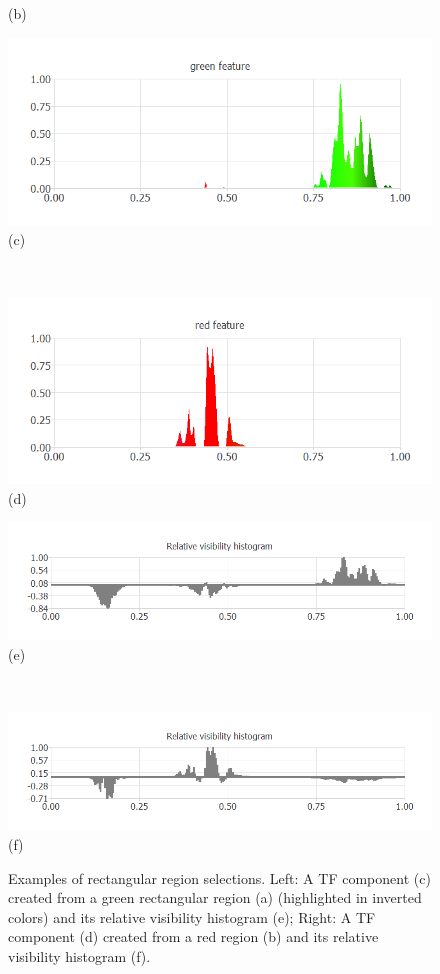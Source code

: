 \documentclass[twoside,twocolumn,10pt]{article}
\begin{document}
\begin{figure}
\begin{minipage}{.2\textwidth}
(b)
	\end{minipage}
	\begin{minipage}{.245\textwidth}
	\centering
	\includegraphics[width=1\linewidth]{nucleon_Green_feature}
(c)
	\end{minipage}~
	\begin{minipage}{.245\textwidth}
		\centering
		\includegraphics[width=1\linewidth]{nucleon_Red_feature}
(d)
	\end{minipage}
	\begin{minipage}{.245\textwidth}
		\centering
		\includegraphics[width=1\linewidth]{nucleon_green_Relative_visibility_histogram}
(e)
	\end{minipage}~
	\begin{minipage}{.245\textwidth}
		\centering
		\includegraphics[width=1\linewidth]{nucleon_red_Relative_visibility_histogram}
(f)
	\end{minipage}
	\caption{Examples of rectangular region selections. Left: A TF component (c) created from a green rectangular region (a) (highlighted in inverted colors) and its relative visibility histogram (e); Right: A TF component (d) created from a red region (b) and its relative visibility histogram (f).}
	\label{fig:nucleon_features}
\end{figure}
\end{document}
